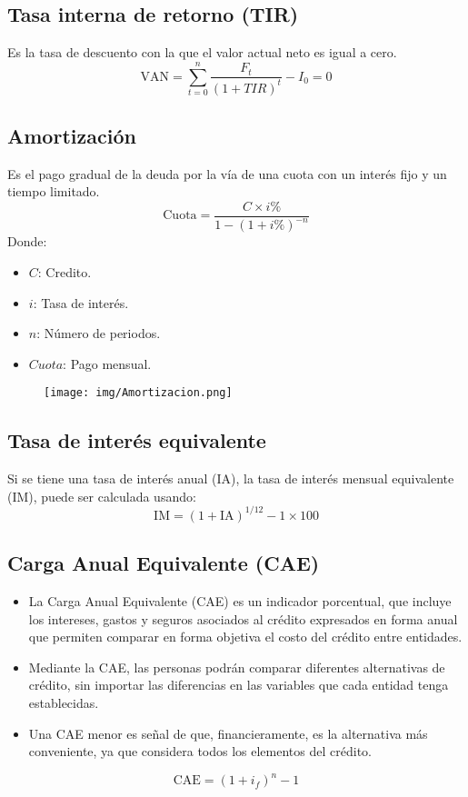 \documentclass{templateNote}
\begin{document}
\subsection*{Tasa interna de retorno (TIR)}
Es la tasa de descuento con la que el valor actual neto es igual a cero.
\begin{equation*}
    \text{VAN} = \sum_{t=0}^{n} \frac{F_t}{(1 + TIR)^t} - I_0 = 0
\end{equation*}

\newpage
\subsection*{Amortización}
Es el pago gradual de la deuda por la vía de una cuota con un interés fijo y un tiempo limitado.
\begin{equation*}
    \text{Cuota} = \frac{C \times i\%}{1 - (1 + i\%)^{-n}}
\end{equation*}
Donde:
\begin{itemize}
    \item $C$: Credito.
    \item $i$: Tasa de interés.
    \item $n$: Número de periodos.
    \item $Cuota$: Pago mensual.
\end{itemize}
\begin{figure}[H]
    \centering
    \texttt{[image: img/Amortizacion.png]}
\end{figure}

\subsection*{Tasa de interés equivalente}
Si se tiene una tasa de interés anual (IA), la tasa de interés mensual equivalente (IM), puede ser calculada usando:
\begin{equation*}
    \text{IM} = (1 + \text{IA})^{1/12} - 1 \times 100
\end{equation*}

\subsection*{Carga Anual Equivalente (CAE)}
\begin{itemize}
    \item La Carga Anual Equivalente (CAE) es un indicador porcentual, que incluye los intereses, gastos y seguros asociados al crédito expresados en forma anual que permiten comparar en forma objetiva el costo del crédito entre entidades.
    \item Mediante la CAE, las personas podrán comparar diferentes alternativas de crédito, sin importar las diferencias en las variables que cada entidad tenga establecidas.
    \item Una CAE menor es señal de que, financieramente, es la alternativa más conveniente, ya que considera todos los elementos del crédito.
\end{itemize}
\begin{equation*}
    \text{CAE} = (1+i_f)^n - 1
\end{equation*}
\end{document}
